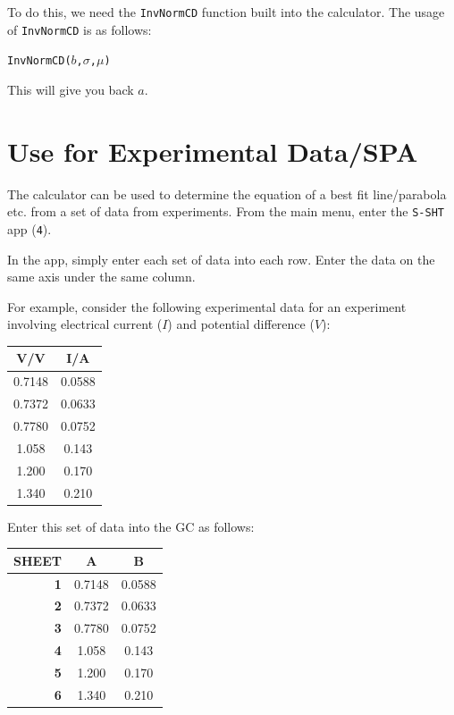 \documentclass[a5paper,draft]{memoir}
\def\code#1{\texttt{#1}}
\newcommand{\addtoindex}[1]{#1\index{#1}}
\begin{document}
To do this, we need the \code{\addtoindex{InvNormCD}} function built into the calculator. The usage of \code{InvNormCD} is as follows:
\begin{center}
	\code{InvNormCD($b$,$\sigma$,$\mu$)}
\end{center}

This will give you back $a$.

\section{Use for Experimental Data/SPA}
The calculator can be used to determine the equation of a best fit line/parabola etc. from a set of data from experiments. From the main menu, enter the \code{S-SHT} app (\code{4}). 

In the app, simply enter each set of data into each row. Enter the data on the same axis under the same column.

For example, consider the following experimental data for an experiment involving electrical current ($I$) and potential difference ($V$): 

\begin{center}
	\setlength{\tabcolsep}{10pt}
	\renewcommand{\arraystretch}{1.2}
	\begin{tabular}{|c|c|}
		\hline
		\textbf{V/V}	& \textbf{I/A} \\
		\hline
		0.7148			& 0.0588 \\
		\hline
		0.7372			& 0.0633 \\
		\hline
		0.7780			& 0.0752 \\
		\hline
		1.058			& 0.143 \\
		\hline
		1.200			& 0.170 \\
		\hline
		1.340			& 0.210 \\
		\hline
	\end{tabular}
\end{center}

Enter this set of data into the GC as follows:

\begin{center}
	\setlength{\tabcolsep}{10pt}
	\renewcommand{\arraystretch}{1.2}
	\begin{tabular}{|r|c|c|}
		\hline
		{\tiny SHEET}& \textbf{A}	& \textbf{B} \\
		\hline
		\textbf{1}	& 0.7148		& 0.0588 \\
		\hline
		\textbf{2}	& 0.7372		& 0.0633 \\
		\hline
		\textbf{3}	& 0.7780		& 0.0752 \\
		\hline
		\textbf{4}	& 1.058			& 0.143 \\
		\hline
		\textbf{5}	& 1.200			& 0.170 \\
		\hline
		\textbf{6}	& 1.340			& 0.210 \\
		\hline
	\end{tabular}
\end{center}
\end{document}
